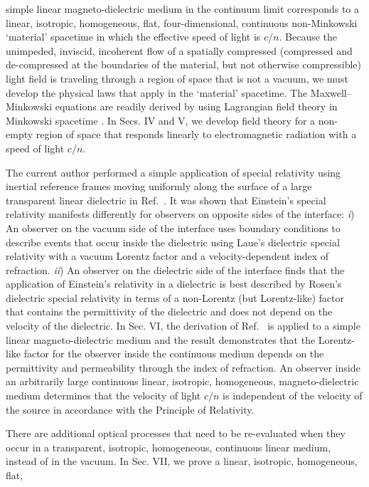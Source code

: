 \documentclass[twocolumn,amssymb,eqsecnum,aps,pra]{revtex4-2}
\begin{document}
simple linear magneto-dielectric medium in the continuum limit
corresponds to a linear, isotropic, homogeneous, flat,
four-dimensional, continuous non-Minkowski `material' spacetime
in which the effective speed of light is $c/n$.
Because the unimpeded, inviscid, incoherent flow of a spatially
compressed (compressed and de-compressed at the boundaries of the
material, but not otherwise compressible) light field is
traveling through a region of space that is not a vacuum, we must
develop the physical laws that apply in the `material' spacetime.
The Maxwell--Minkowski equations are readily derived by using 
Lagrangian field theory in Minkowski spacetime \cite{BIGold,BICohen}.
In Secs. IV and V, we develop field theory for a non-empty region
of space that responds linearly to electromagnetic radiation with
a speed of light $c/n$.
\par
The current author performed a simple application of special relativity
using inertial reference frames moving uniformly along the surface
of a large transparent linear dielectric in Ref.~\cite{BIAJP}.
It was shown that Einstein's special relativity manifests differently
for observers on opposite sides of the interface:
\textit{i}) An observer on the vacuum side of the interface uses
boundary conditions to describe events that occur inside the
dielectric using Laue's \cite{BILaue} dielectric special relativity
with a vacuum Lorentz factor and a velocity-dependent index of
refraction.
\textit{ii}) An observer on the dielectric side of the interface
finds that the application of Einstein's relativity in a dielectric
is best described by Rosen's \cite{BIRosen} dielectric special
relativity in terms of a non-Lorentz (but Lorentz-like) factor
that contains the permittivity of the dielectric and does not
depend on the velocity of the dielectric.
In Sec. VI, the derivation of Ref.~\cite{BIAJP} is applied to a 
simple linear magneto-dielectric medium and the result demonstrates 
that the Lorentz-like factor for the observer inside the continuous
medium depends on the permittivity and permeability through the index
of refraction.
An observer inside an arbitrarily large continuous linear, isotropic,
homogeneous, magneto-dielectric medium determines that the velocity of
light $c/n$ is independent of the velocity of
the source in accordance with the Principle of Relativity.
\par
There are additional optical processes that need to be re-evaluated
when they occur in a transparent, isotropic, homogeneous,
continuous linear medium, instead of in the vacuum.
In Sec. VII, we prove a linear, isotropic, homogeneous, flat,
\end{document}
